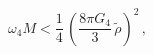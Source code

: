\begin{equation}
\omega_4 M < \frac{1}{4}\,\left(\frac{8 \pi G_4}{3}\,\tilde \rho\right)^2\,,
\end{equation}

